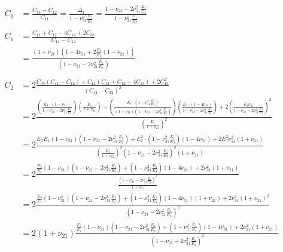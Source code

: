 \documentclass{article}
\begin{document}
\begin{align}
C_0 
&= \frac{C_{11} - C_{12}}{C_{11}} = \frac{\Delta_1}{1-\nu_{31}^2 \frac{E_1}{E_3}} = \frac{1-\nu_{21}-2\nu_{31}^2\frac{E_1}{E_3}}{1-\nu_{31}^2 \frac{E_1}{E_3}} \\
\\
C_1 
&= \frac{C_{11} +C_{12} -4C_{13} +2C_{33}}{C_{11}-C_{12}}   \\
&= \frac{\left( 1+\nu_{21} \right) \left( 1-4\nu_{31} + 2 \frac{E_3}{E_1} \left( 1-\nu_{21} \right) \right) }{ \left( 1-\nu_{21}-2\nu_{31}^2\frac{E_1}{E_3} \right) }  \\
\\
C_2 
&= 2 \frac{C_{33} \left( C_{11} - C_{12} \right) + C_{11} \left( C_{11}+C_{12}-4C_{13} \right) + 2C_{13}^2 }{\left( C_{11}-C_{12} \right)^2}   \\
&= 2 \frac{ \left( \frac{ E_3 \cdot \left( 1-\nu_{21} \right) }{ 1-\nu_{21}-2\nu_{31}^2\frac{E_1}{E_3} } \right) \left( \frac{E_1}{1+\nu_{21}} \right) + \left( \frac{E_1 \cdot \left( 1-\nu_{31}^2 \frac{E_1}{E_3} \right)}{ \left(1+\nu_{21}\right) \left( 1-\nu_{21}-2\nu_{31}^2\frac{E_1}{E_3} \right) } \right)  \left( \frac{E_1 \cdot \left(1-4\nu_{31} \right)}{ 1-\nu_{21}-2\nu_{31}^2\frac{E_1}{E_3} } \right) + 2 \left( \frac{E_1 \nu_{31}}{ 1-\nu_{21}-2\nu_{31}^2\frac{E_1}{E_3} } \right)^2 }{\left( \frac{E_1}{1+\nu_{21}} \right)^2}   \\
&= 2 \frac{ E_3 E_1 \left( 1-\nu_{21} \right) \left( 1-\nu_{21}-2\nu_{31}^2\frac{E_1}{E_3}  \right) + E_1^2 \cdot \left( 1-\nu_{31}^2 \frac{E_1}{E_3} \right) \left(1-4\nu_{31} \right)+ 2 E_1^2 \nu_{31}^2 \left( 1+\nu_{21} \right) }{\left( \frac{E_1}{1+\nu_{21}} \right)^2 \left( 1-\nu_{21}-2\nu_{31}^2\frac{E_1}{E_3} \right)^2 \left( 1+\nu_{21} \right) }   \\
&= 2 \frac{ \frac{E_3}{E_1} \left( 1-\nu_{21} \right) \left( 1-\nu_{21}-2\nu_{31}^2\frac{E_1}{E_3}  \right) + \left( 1-\nu_{31}^2 \frac{E_1}{E_3} \right) \left(1-4\nu_{31} \right)+ 2\nu_{31}^2 \left( 1+\nu_{21} \right) }{ \frac{ \left( 1-\nu_{21}-2\nu_{31}^2\frac{E_1}{E_3} \right)^2 }{1+\nu_{21}} }   \\
&= 2 \frac{ \frac{E_3}{E_1} \left( 1-\nu_{21}^2 \right) \left( 1-\nu_{21}-2\nu_{31}^2\frac{E_1}{E_3}  \right) + \left( 1-\nu_{31}^2 \frac{E_1}{E_3} \right) \left(1-4\nu_{31} \right) \left(1+\nu_{21}\right) + 2\nu_{31}^2 \left( 1+\nu_{21} \right)^2 }{ \left( 1-\nu_{21}-2\nu_{31}^2\frac{E_1}{E_3} \right)^2 }   \\
&= 2 \left( 1+\nu_{21} \right) \frac{ \frac{E_3}{E_1} \left( 1-\nu_{21} \right) \left( 1-\nu_{21}-2\nu_{31}^2\frac{E_1}{E_3}  \right) + \left( 1-\nu_{31}^2 \frac{E_1}{E_3} \right) \left(1-4\nu_{31} \right)+ 2\nu_{31}^2 \left( 1+\nu_{21} \right) }{ \left( 1-\nu_{21}-2\nu_{31}^2\frac{E_1}{E_3} \right)^2 }   \\
\end{align}
\end{document}
